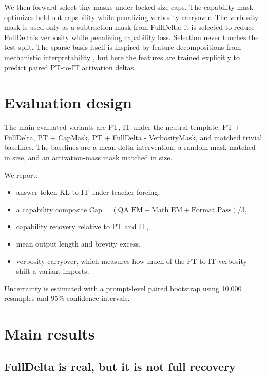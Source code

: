 \documentclass[11pt]{article}
\begin{document}
We then forward-select tiny masks under locked size caps. The capability mask optimizes held-out capability while penalizing verbosity carryover. The verbosity mask is used only as a subtraction mask from FullDelta: it is selected to reduce FullDelta's verbosity while penalizing capability loss. Selection never touches the test split. The sparse basis itself is inspired by feature decompositions from mechanistic interpretability \citep{elhage2022toy,bricken2023monosemanticity}, but here the features are trained explicitly to predict paired PT-to-IT activation deltas.

\section{Evaluation design}

The main evaluated variants are PT, IT under the neutral template, PT + FullDelta, PT + CapMask, PT + FullDelta - VerbosityMask, and matched trivial baselines. The baselines are a mean-delta intervention, a random mask matched in size, and an activation-mass mask matched in size.

We report:
\begin{itemize}
    \item answer-token KL to IT under teacher forcing,
    \item a capability composite $\mathrm{Cap} = (\mathrm{QA\_EM} + \mathrm{Math\_EM} + \mathrm{Format\_Pass})/3$,
    \item capability recovery relative to PT and IT,
    \item mean output length and brevity excess,
    \item verbosity carryover, which measures how much of the PT-to-IT verbosity shift a variant imports.
\end{itemize}

Uncertainty is estimated with a prompt-level paired bootstrap using 10{,}000 resamples and 95\% confidence intervals.

\section{Main results}

\subsection{FullDelta is real, but it is not full recovery}


\end{document}
